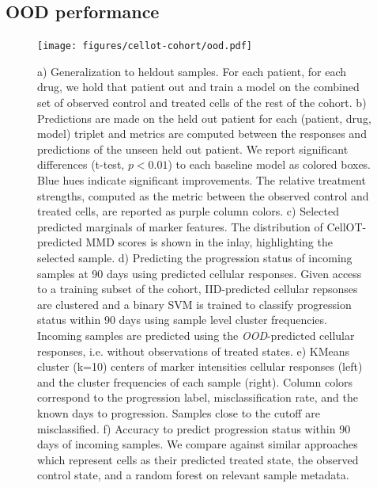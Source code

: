 \subsection{OOD performance}
\begin{figure}
  \label{fig:ood-main}
  \begin{center}
    \texttt{[image: figures/cellot-cohort/ood.pdf]}
  \end{center}
  \caption{
    a) Generalization to heldout samples. For each patient, for each drug, we hold that patient out and train a model on the combined set of observed control and treated cells of the rest of the cohort.
    b) Predictions are made on the held out patient for each (patient, drug, model) triplet and metrics are computed between the responses and predictions of the unseen held out patient.
    We report significant differences (t-test, $p < 0.01$) to each baseline model as colored boxes. Blue hues indicate significant improvements.
    The relative treatment strengths, computed as the metric between the observed control and treated cells, are reported as purple column colors.
    c) Selected predicted marginals of marker features.
    The distribution of CellOT-predicted MMD scores is shown in the inlay, highlighting the selected sample.
    d) Predicting the progression status of incoming samples at 90 days using predicted cellular responses.
    Given access to a training subset of the cohort, IID-predicted cellular repsonses are clustered and a binary SVM is trained to classify progression status within 90 days using sample level cluster frequencies.
    Incoming samples are predicted using the \emph{OOD}-predicted cellular responses, i.e. without observations of treated states.
    e) KMeans cluster (k=10) centers of marker intensities cellular responses (left) and the cluster frequencies of each sample (right).
    Column colors correspond to the progression label, misclassification rate, and the known days to progression. Samples close to the cutoff are misclassified.
    f) Accuracy to predict progression status within 90 days of incoming samples.
    We compare against similar approaches which represent cells as their predicted treated state, the observed control state, and a random forest on relevant sample metadata.
  }
\end{figure}

